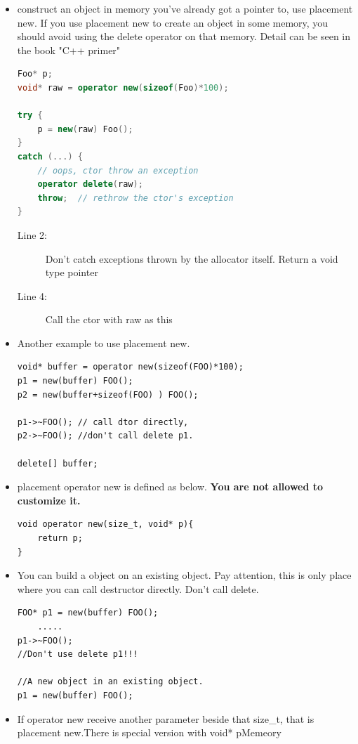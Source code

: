 \documentclass[a4paper,11pt,twoside]{book}
\begin{document}
\begin{itemize}
	\item construct an object in memory you've already got a pointer to, use placement new. If you use placement new to create an object in some memory, you should avoid using the delete operator on that memory.  Detail can be seen in the book "C++ primer"
\begin{lstlisting}[frame=single, language=c++]
Foo* p;
void* raw = operator new(sizeof(Foo)*100);
	
try {
	p = new(raw) Foo();  
}
catch (...) {
	// oops, ctor throw an exception
	operator delete(raw);
	throw;  // rethrow the ctor's exception
}
\end{lstlisting}
\begin{description}
	\item[Line 2:] Don't catch exceptions thrown by the allocator itself. Return a void type pointer
	\item[Line 4:] Call the ctor with raw as this
\end{description}
	
	\item Another example to use placement new.
\begin{lstlisting}[numbers=none]
void* buffer = operator new(sizeof(FOO)*100);
p1 = new(buffer) FOO();
p2 = new(buffer+sizeof(FOO) ) FOO();
	
p1->~FOO(); // call dtor directly,
p2->~FOO(); //don't call delete p1.
	
delete[] buffer;
\end{lstlisting}
	
	\item placement operator new is defined as below. \textbf{You are not allowed to customize it.}
\begin{lstlisting}[numbers = none]
void operator new(size_t, void* p){
	return p;
}
\end{lstlisting}
	
	\item You can build a object on an existing object. Pay attention, this is only place where you can call destructor directly. Don't call delete. 
\begin{lstlisting}[numbers=none]
FOO* p1 = new(buffer) FOO();
	.....
p1->~FOO();
//Don't use delete p1!!!
	
//A new object in an existing object.
p1 = new(buffer) FOO(); 
\end{lstlisting}
	
	\item If operator new receive another parameter beside that size\_t, that is placement new.There is special version with void* pMemeory
	

\end{itemize}
\end{document}
